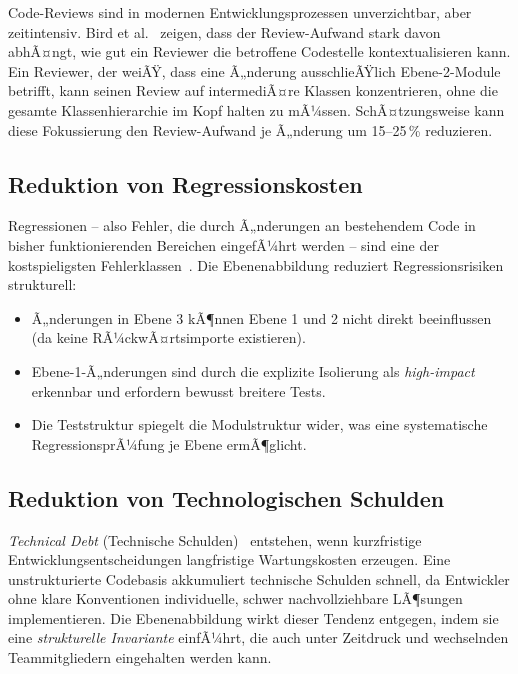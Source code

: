 ﻿\documentclass[a4paper,12pt]{article}
\begin{document}
Code-Reviews sind in modernen Entwicklungsprozessen unverzichtbar, aber
zeitintensiv. Bird et al.~\cite{bird2011} zeigen, dass der Review-Aufwand
stark davon abhÃ¤ngt, wie gut ein Reviewer die betroffene Codestelle
kontextualisieren kann. Ein Reviewer, der weiÃŸ, dass eine Ã„nderung ausschlieÃŸlich
Ebene-2-Module betrifft, kann seinen Review auf intermediÃ¤re Klassen
konzentrieren, ohne die gesamte Klassenhierarchie im Kopf halten zu mÃ¼ssen.
SchÃ¤tzungsweise kann diese Fokussierung den Review-Aufwand je Ã„nderung um
15--25\,\% reduzieren.

\subsection{Reduktion von Regressionskosten}

Regressionen -- also Fehler, die durch Ã„nderungen an bestehendem Code in
bisher funktionierenden Bereichen eingefÃ¼hrt werden -- sind eine der
kostspieligsten Fehlerklassen~\cite{pressman2014}. Die Ebenenabbildung
reduziert Regressionsrisiken strukturell:

\begin{itemize}[leftmargin=*]
	\item Ã„nderungen in Ebene 3 kÃ¶nnen Ebene 1 und 2 nicht direkt beeinflussen
	(da keine RÃ¼ckwÃ¤rtsimporte existieren).
	\item Ebene-1-Ã„nderungen sind durch die explizite Isolierung als
	\textit{high-impact} erkennbar und erfordern bewusst breitere Tests.
	\item Die Teststruktur spiegelt die Modulstruktur wider, was eine
	systematische RegressionsprÃ¼fung je Ebene ermÃ¶glicht.
\end{itemize}

\subsection{Reduktion von Technologischen Schulden}

\textit{Technical Debt} (Technische Schulden)~\cite{cunningham1992} entstehen,
wenn kurzfristige Entwicklungsentscheidungen langfristige Wartungskosten
erzeugen. Eine unstrukturierte Codebasis akkumuliert technische Schulden schnell,
da Entwickler ohne klare Konventionen individuelle, schwer nachvollziehbare
LÃ¶sungen implementieren. Die Ebenenabbildung wirkt dieser Tendenz entgegen,
indem sie eine \textit{strukturelle Invariante} einfÃ¼hrt, die auch unter
Zeitdruck und wechselnden Teammitgliedern eingehalten werden kann.
\end{document}
